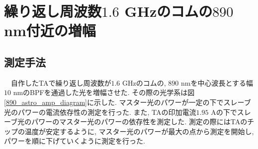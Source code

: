 \documentclass[uplatex, dvipdfmx, a4paper, report, papersize, 11pt]{jsbook}
\begin{document}
\section{繰り返し周波数$1.6$ GHzのコムの$890$ nm付近の増幅}
\subsection{測定手法}
　自作したTAで繰り返し周波数が$1.6$ GHzのコムの, $890$ nmを中心波長とする幅$10$ nmのBPFを通過した光を増幅させた. その際の光学系は図\ref{890_astro_amp_diagram}に示した. マスター光のパワーが一定の下でスレーブ光のパワーの電流依存性の測定を行った. また, TAの印加電流$1.95$ Aの下でスレーブ光のパワーのマスター光のパワーの依存性を測定した. 測定の際にはTAのチップの温度が安定するように, マスター光のパワーが最大の点から測定を開始し, パワーを順に下げていくように測定を行った.
\end{document}
